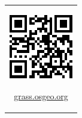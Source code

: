 \documentclass[25pt, margin=0mm, innermargin=15mm, blockverticalspace=15mm, colspace=15mm, subcolspace=8mm]{tikzposter}
\begin{document}
\begin{columns}
{\newcommand{\qrcodesize}{0.05\linewidth}


\begin{center}
\begin{tabular}{c}


\begin{minipage}{\qrcodesize}
\includegraphics[width=\textwidth]{./images/grass_qr.pdf}
\end{minipage}

\begin{minipage}{0.15\linewidth}
\small {\url{grass.osgeo.org}}
\end{minipage}


\end{tabular}
\end{center}}
\end{columns}
\end{document}
